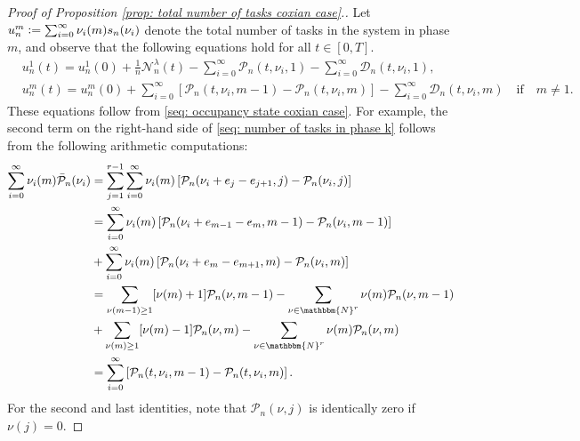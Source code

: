 \documentclass[a4paper, 12pt]{article}
\theoremstyle{definition}
\newcommand{\defeq}{\vcentcolon=}
\newcommand{\calD}{\mathcal{D}}
\newcommand{\calN}{\mathcal{N}}
\newcommand{\calP}{\mathcal{P}}
\newcommand{\N}{\mathbbm{N}}
\begin{document}
\begin{appendices}
\begin{proof}[Proof of Proposition \ref{prop: total number of tasks coxian case}.]
	Let $u_n^m \defeq \sum_{i = 0}^\infty \nu_i(m)s_n(\nu_i)$ denote the total number of tasks in the system in phase $m$, and observe that the following equations hold for all $t \in [0, T]$.
	\begin{subequations}
		\begin{align}
			&u_n^1(t) = u_n^1(0) + \frac{1}{n}\calN_n^\lambda(t) - \sum_{i = 0}^\infty \calP_n(t, \nu_i, 1) - \sum_{i = 0}^\infty \calD_n(t, \nu_i, 1), \label{seq: number of tasks in phase 1} \\
			&u_n^m(t) = u_n^m(0) + \sum_{i = 0}^\infty \left[\calP_n(t, \nu_i, m - 1) - \calP_n(t, \nu_i, m)\right] - \sum_{i = 0}^\infty \calD_n(t, \nu_i, m) \quad \text{if} \quad m \neq 1. \label{seq: number of tasks in phase k}
		\end{align}
	\end{subequations}
	These equations follow from \eqref{seq: occupancy state coxian case}. For example, the second term on the right-hand side of \eqref{seq: number of tasks in phase k} follows from the following arithmetic computations:
	\begin{align*}
		\sum_{i = 0}^\infty \nu_i(m)\bar{\calP}_n(\nu_i) &= \sum_{j = 1}^{r - 1}  \sum_{i = 0}^\infty \nu_i(m) \left[\calP_n(\nu_i +e_j - e_{j + 1}, j) - \calP_n(\nu_i, j)\right] \\
		&= \sum_{i = 0}^\infty \nu_i(m)\left[\calP_n(\nu_i +e_{m - 1} - e_m, m - 1) - \calP_n(\nu_i, m - 1)\right] \\
		&+ \sum_{i = 0}^\infty \nu_i(m)\left[\calP_n(\nu_i +e_m - e_{m + 1}, m) - \calP_n(\nu_i, m)\right] \\
		&= \sum_{\nu(m - 1) \geq 1} [\nu(m) + 1]\calP_n(\nu, m - 1) - \sum_{\nu \in \N^r} \nu(m)\calP_n(\nu, m - 1) \\
		&+ \sum_{\nu(m) \geq 1} [\nu(m) - 1]\calP_n(\nu, m) - \sum_{\nu \in \N^r} \nu(m)\calP_n(\nu, m) \\
		&= \sum_{i = 0}^\infty \left[\calP_n(t, \nu_i, m - 1) - \calP_n(t, \nu_i, m)\right].
	\end{align*}
	For the second and last identities, note that $\calP_n(\nu, j)$ is identically zero if $\nu(j) = 0$.
	

\end{proof}
\end{appendices}
\end{document}
